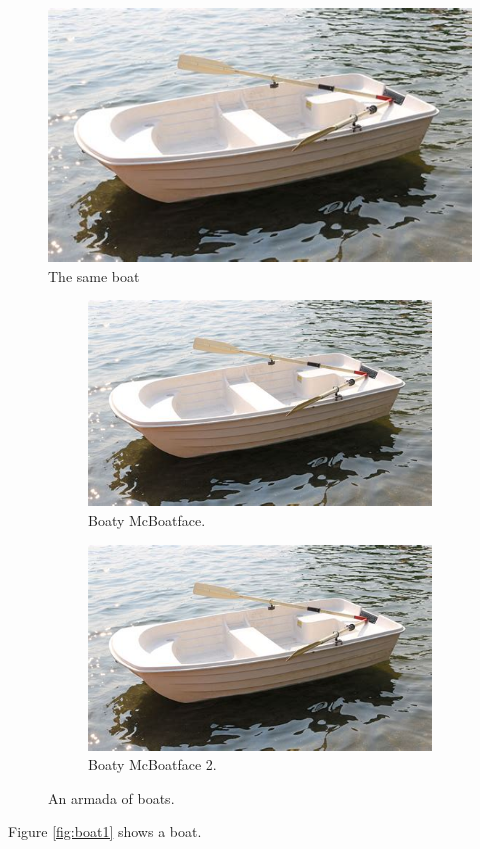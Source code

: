 \documentclass{article}
\begin{document}
  \begin{figure}[h!]
    \includegraphics[width=\linewidth]{boat.jpeg}
    \caption{The same boat}
    \label{fig:boat2}
  \end{figure}

  \begin{figure}[b]
    \centering
    \begin{subfigure}[b]{0.4\linewidth}
      \includegraphics[width=\linewidth]{boat.jpeg}
      \caption{Boaty McBoatface.}
    \end{subfigure}
    \begin{subfigure}[b]{0.4\linewidth}
      \includegraphics[width=\linewidth]{boat.jpeg}
      \caption{Boaty McBoatface 2.}
    \end{subfigure}
    \caption{An armada of boats.}
    \label{fig:boats}
  \end{figure}

  Figure \ref{fig:boat1} shows a boat.
\end{document}
